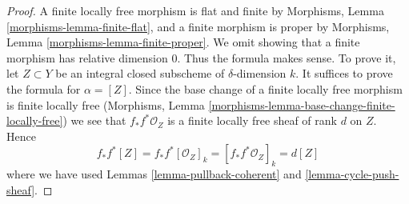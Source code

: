 \documentclass[10pt,a4paper]{amsart}
\theoremstyle{plain}
\theoremstyle{definition}
\theoremstyle{remark}
\numberwithin{equation}{subsection}
\begin{document}
\begin{proof}
A finite locally free morphism is flat and finite by
Morphisms, Lemma \ref{morphisms-lemma-finite-flat},
and a finite morphism is proper
by Morphisms, Lemma \ref{morphisms-lemma-finite-proper}.
We omit showing that a finite
morphism has relative dimension $0$. Thus the formula makes sense.
To prove it, let $Z \subset Y$ be an integral closed subscheme
of $\delta$-dimension $k$. It suffices to prove the formula
for $\alpha = [Z]$. Since the base change of a finite locally free
morphism is finite locally free
(Morphisms, Lemma \ref{morphisms-lemma-base-change-finite-locally-free})
we see that $f_*f^*\mathcal{O}_Z$ is a finite locally free sheaf of
rank $d$ on $Z$. Hence
$$
f_*f^*[Z] = f_*f^*[\mathcal{O}_Z]_k =
[f_*f^*\mathcal{O}_Z]_k = d[Z]
$$
where we have used Lemmas \ref{lemma-pullback-coherent} and
\ref{lemma-cycle-push-sheaf}.
\end{proof}
\end{document}
